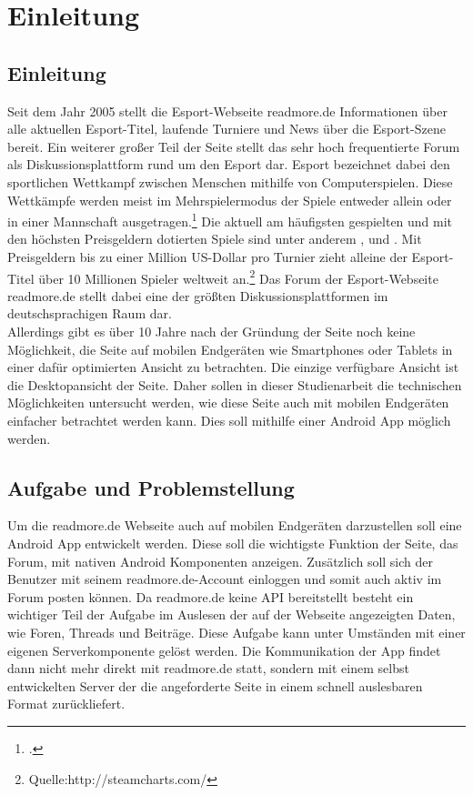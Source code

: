 \chapter{Einleitung}
\label{cha:Einleitung}

\section{Einleitung}
Seit dem Jahr 2005 stellt die Esport-Webseite readmore.de Informationen über
alle aktuellen Esport-Titel, laufende Turniere und News über die Esport-Szene
bereit. Ein weiterer großer Teil der Seite stellt das sehr hoch frequentierte
Forum als Diskussionsplattform rund um den Esport dar. Esport bezeichnet dabei
den sportlichen Wettkampf zwischen Menschen mithilfe von Computerspielen. Diese
Wettkämpfe werden meist im Mehrspielermodus der Spiele entweder allein oder in
einer Mannschaft ausgetragen.\footcite{esport1} Die aktuell am häufigsten
gespielten und mit den höchsten Preisgeldern dotierten Spiele sind unter anderem
,  und .
Mit Preisgeldern bis zu einer Million US-Dollar pro Turnier zieht alleine der
Esport-Titel  über 10 Millionen Spieler weltweit
an.\footnote{Quelle:http://steamcharts.com/}
Das Forum der Esport-Webseite readmore.de stellt dabei eine der größten
Diskussionsplattformen im deutschsprachigen Raum dar. \\
Allerdings gibt es über 10 Jahre nach der Gründung der Seite noch keine
Möglichkeit, die Seite auf mobilen Endgeräten wie Smartphones oder Tablets in
einer dafür optimierten Ansicht zu betrachten. Die einzige verfügbare Ansicht
ist die Desktopansicht der Seite. Daher sollen in dieser Studienarbeit die
technischen Möglichkeiten untersucht werden, wie diese Seite auch mit mobilen
Endgeräten einfacher betrachtet werden kann. Dies soll mithilfe einer Android
App möglich werden.
\section{Aufgabe und Problemstellung}
Um die readmore.de Webseite auch auf mobilen Endgeräten darzustellen soll eine
Android App entwickelt werden. Diese soll die wichtigste Funktion der Seite, das
Forum, mit nativen Android Komponenten anzeigen. Zusätzlich soll sich der
Benutzer mit seinem readmore.de-Account einloggen und somit auch aktiv im Forum
posten können. Da readmore.de keine API bereitstellt besteht ein wichtiger Teil
der Aufgabe im Auslesen der auf der Webseite angezeigten Daten, wie Foren, Threads und Beiträge. Diese
Aufgabe kann unter Umständen mit einer eigenen Serverkomponente gelöst werden.
Die Kommunikation der App findet dann nicht mehr direkt mit readmore.de statt,
sondern mit einem selbst entwickelten Server der die angeforderte Seite in einem
schnell auslesbaren Format zurückliefert. 
